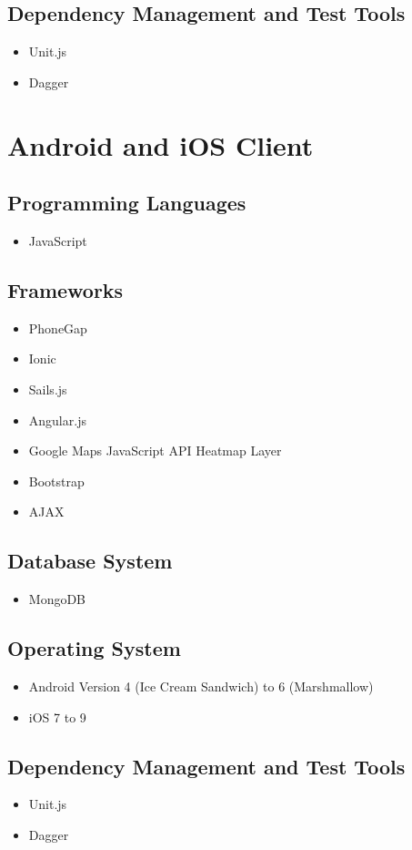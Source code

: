 \documentclass[11pt,fleqn]{book} %
\begin{document}
	\subsection{Dependency Management and Test Tools}
	\begin{itemize}
		\item Unit.js
		\item Dagger
	\end{itemize}
	\section{Android and iOS Client}
	\subsection{Programming Languages}
	\begin{itemize}
		\item JavaScript
	\end{itemize}
	\subsection{Frameworks}
	\begin{itemize}
		\item PhoneGap
		\item Ionic
		\item Sails.js
		\item Angular.js
		\item Google Maps JavaScript API Heatmap Layer
		\item Bootstrap
		\item AJAX					
	\end{itemize}
	\subsection{Database System}
	\begin{itemize}
		\item MongoDB
	\end{itemize}
	\subsection{Operating System}
	\begin{itemize}
		\item Android Version 4 (Ice Cream Sandwich) to 6 (Marshmallow)
		\item iOS 7 to 9				
	\end{itemize}
	\subsection{Dependency Management and Test Tools}
	\begin{itemize}
		\item Unit.js
		\item Dagger
	\end{itemize}
	
\end{document}
